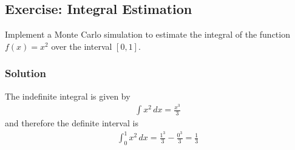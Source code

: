 \documentclass[letterpaper,10pt,english]{jupyterBook}
\begin{document}
\subsection{Exercise: Integral Estimation}
\label{\detokenize{01:exercise-integral-estimation}}
\sphinxAtStartPar
Implement a Monte Carlo simulation to estimate the integral of the function \(f(x) = x^2\) over the interval \([0, 1]\).


\subsubsection{Solution}
\label{\detokenize{01:id1}}
\sphinxAtStartPar
The indefinite integral is given by
\begin{equation*}
\begin{split}\int x^2 \,dx = \frac{x^3}{3}\end{split}
\end{equation*}
\sphinxAtStartPar
and therefore the definite interval is
\begin{equation*}
\begin{split}\int_{0}^{1} x^2 \,dx = \frac{1^3}{3} - \frac{0^3}{3} = \frac13\end{split}
\end{equation*}
\end{document}
